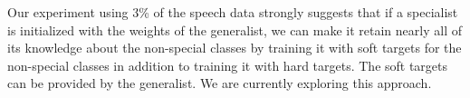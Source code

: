 Our experiment using 3\% of the speech data strongly suggests that if
a specialist is initialized with the weights of the generalist, we can
make it retain nearly all of its knowledge about the non-special
classes by training it with soft targets for the non-special classes
in addition to training it with hard targets. The soft targets can
be provided by the generalist.  We are currently exploring this
approach.






